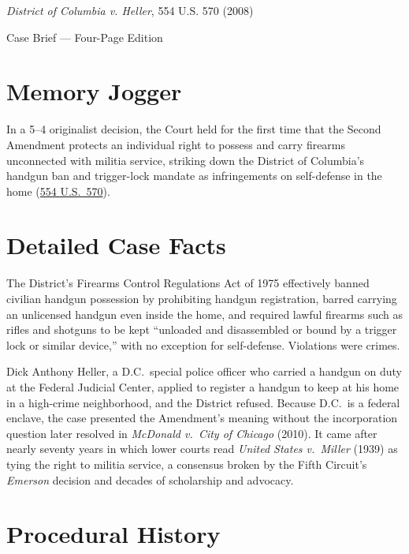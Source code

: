 \documentclass[12pt]{article}
\begin{document}
\begin{center}
{\LARGE \textit{District of Columbia v. Heller}, 554 U.S. 570 (2008)\par}
\vspace{0.8em}
{\large Case Brief --- Four-Page Edition\par}
\end{center}
\vspace{1em}

\section{Memory Jogger}

In a 5--4 originalist decision, the Court held for the first time that the Second Amendment protects an individual right to possess and carry firearms unconnected with militia service, striking down the District of Columbia's handgun ban and trigger-lock mandate as infringements on self-defense in the home (\href{https://supreme.justia.com/cases/federal/us/554/570/}{554 U.S.\ 570}).

\section{Detailed Case Facts}

The District's Firearms Control Regulations Act of 1975 effectively banned civilian handgun possession by prohibiting handgun registration, barred carrying an unlicensed handgun even inside the home, and required lawful firearms such as rifles and shotguns to be kept ``unloaded and disassembled or bound by a trigger lock or similar device,'' with no exception for self-defense. Violations were crimes.

Dick Anthony Heller, a D.C.\ special police officer who carried a handgun on duty at the Federal Judicial Center, applied to register a handgun to keep at his home in a high-crime neighborhood, and the District refused. Because D.C.\ is a federal enclave, the case presented the Amendment's meaning without the incorporation question later resolved in \textit{McDonald v.\ City of Chicago} (2010). It came after nearly seventy years in which lower courts read \textit{United States v.\ Miller} (1939) as tying the right to militia service, a consensus broken by the Fifth Circuit's \textit{Emerson} decision and decades of scholarship and advocacy.

\section{Procedural History}
\end{document}
